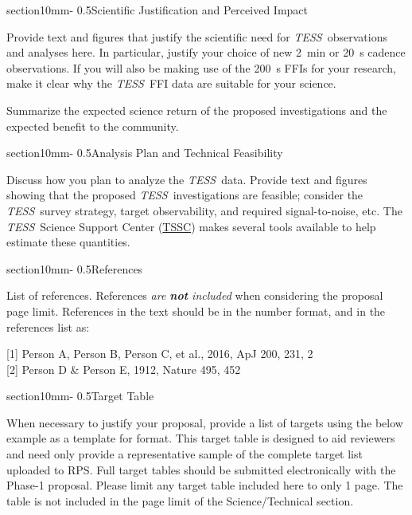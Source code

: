 \documentclass[letterpaper,12pt]{article}
\makeatletter
\renewcommand{\section}{\@startsection%
{section}{1}{0mm}{-\baselineskip}%
{0.5\baselineskip}{\normalfont\Large\bfseries}}%
\newcommand{\tess}{{\it TESS}}
\makeatother
\begin{document}
\section{Scientific Justification and Perceived Impact}

Provide text and figures that justify the scientific need for \tess\ observations and analyses here. In particular, justify your choice of new 2~min or 20~s cadence observations. If you will also be making use of the 200~s FFIs for your research, make it clear why the \tess\ FFI data are suitable for your science.


Summarize the expected science return of the proposed investigations and the expected benefit to the community.



\section{Analysis Plan and Technical Feasibility}

Discuss how you plan to analyze the \tess\ data. Provide text and figures showing that the proposed \tess\ investigations are feasible; consider the 
\tess\ survey strategy, target observability, and required signal-to-noise, etc. The \tess\ Science 
Support Center (\href{https://heasarc.gsfc.nasa.gov/docs/tess/}{TSSC}) makes several tools available to help estimate these quantities. 


\section{References}

List of references. References {\it are {\bf not} included} when considering the
proposal page limit. References in the text should be in the number format, and in the references list as:

[1] Person A, Person B, Person C, et al., 2016, ApJ 200, 231, 2\\

[2] Person D \& Person E, 1912, Nature 495, 452


\section{Target Table}

When necessary to justify your proposal, provide a list of targets using the below example as a template for format. This target table is designed to aid reviewers and need only provide a representative sample of the complete target list uploaded to RPS. Full target tables should be submitted electronically with the Phase-1 proposal. Please limit any target table included here to only 1 page. The table is not included in the page limit of the Science/Technical section. 
\end{document}

